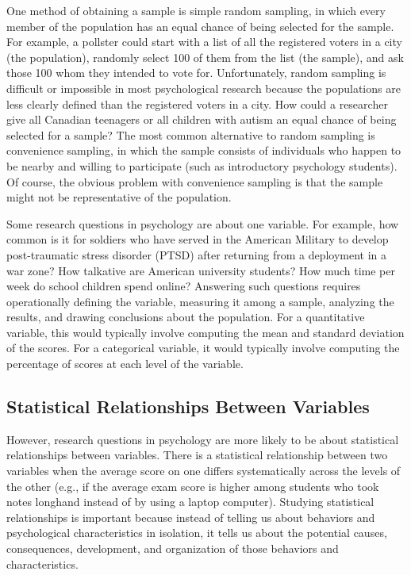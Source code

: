 One method of obtaining a sample is simple random sampling, in which every member of the population has an equal chance of being selected for the sample. For example, a pollster could start with a list of all the registered voters in a city (the population), randomly select 100 of them from the list (the sample), and ask those 100 whom they intended to vote for. Unfortunately, random sampling is difficult or impossible in most psychological research because the populations are less clearly defined than the registered voters in a city. How could a researcher give all Canadian teenagers or all children with autism an equal chance of being selected for a sample? The most common alternative to random sampling is convenience sampling, in which the sample consists of individuals who happen to be nearby and willing to participate (such as introductory psychology students). Of course, the obvious problem with convenience sampling is that the sample might not be representative of the population.

Some research questions in psychology are about one variable. For example, how common is it for soldiers who have served in the American Military to develop post-traumatic stress disorder (PTSD) after returning from a deployment in a war zone? How talkative are American university students? How much time per week do school children spend online? Answering such questions requires operationally defining the variable, measuring it among a sample, analyzing the results, and drawing conclusions about the population. For a quantitative variable, this would typically involve computing the mean and standard deviation of the scores. For a categorical variable, it would typically involve computing the percentage of scores at each level of the variable.

\subsection{Statistical Relationships Between Variables}

However, research questions in psychology are more likely to be about statistical relationships between variables. There is a statistical relationship between two variables when the average score on one differs systematically across the levels of the other (e.g., if the average exam score is higher among students who took notes longhand instead of by using a laptop computer). Studying statistical relationships is important because instead of telling us about behaviors and psychological characteristics in isolation, it tells us about the potential causes, consequences, development, and organization of those behaviors and characteristics.

